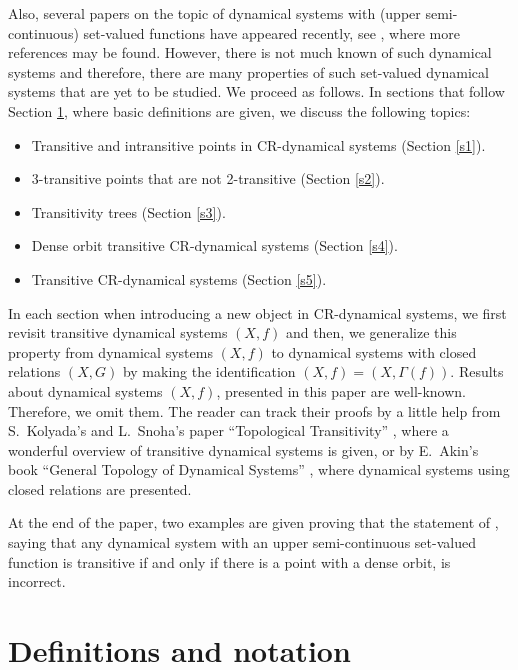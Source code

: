\documentclass[a4paper,12pt]{article} %
\begin{document}
Also,  several papers on the topic of dynamical systems with (upper semi-continuous) set-valued functions have appeared recently, see \cite{BEGK,CP,LP,LYY,LWZ,KN,KW,MRT,R,SS,SS2}, where more references may be found.  However,  there is not much known of such dynamical systems and therefore,  there are many properties of such set-valued dynamical systems that are yet to be studied.  We proceed as follows. In sections that follow Section \ref{s00}, where basic definitions are given, we discuss the following topics:
\begin{itemize}
\item Transitive and intransitive points in CR-dynamical systems (Section \ref{s1}).
\item 3-transitive points that are not 2-transitive (Section \ref{s2}).
\item Transitivity trees (Section \ref{s3}).
\item Dense orbit transitive CR-dynamical systems  (Section \ref{s4}).
\item Transitive CR-dynamical systems (Section \ref{s5}).
\end{itemize}
In each section when introducing a new object in CR-dynamical systems,  we first revisit transitive  dynamical systems $(X,f)$ and then, we  generalize this property from dynamical systems $(X,f)$ to dynamical systems with closed relations $(X,G)$ by making the identification $(X,f)=(X,\Gamma(f))$.   Results about dynamical systems $(X,f)$,  presented in this paper are well-known.  Therefore, we omit them. The reader can track their proofs by a little help from S.~Kolyada's and L.~Snoha's paper ``Topological Transitivity'' \cite{KS}, where a wonderful overview of transitive dynamical systems is given,  or by E.~Akin's book ``General Topology of Dynamical Systems'' \cite{A}, where dynamical systems using closed relations are presented. 

At the end of the paper, two examples are given proving that the statement of \cite[Theorem 9, page 3]{SS},  saying that any dynamical system with an upper semi-continuous set-valued function is transitive if and only if there is a point with a dense orbit,  is incorrect.

\section{Definitions and notation} \label{s00}
\end{document}
